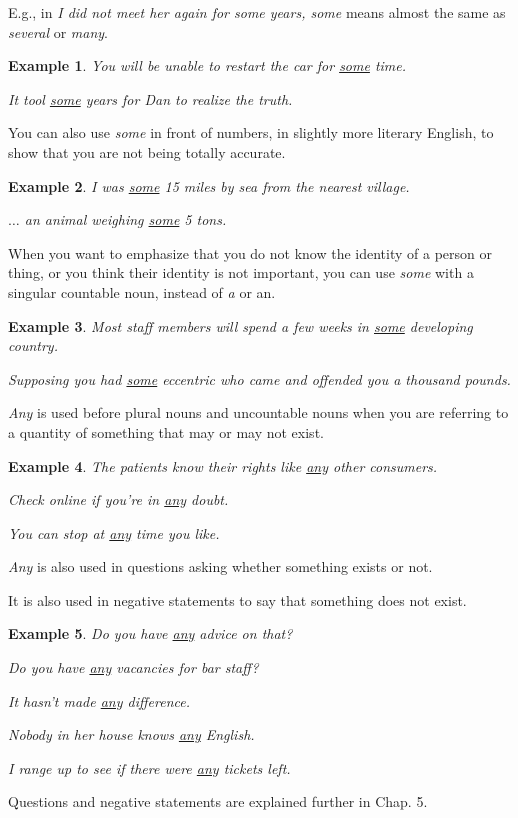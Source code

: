 \documentclass[oneside]{book}
\numberwithin{equation}{section}
\newtheorem{example}{Example}[section]
\begin{document}
E.g., in \textit{I did not meet her again for some years, some} means almost the same as \textit{several} or \textit{many}.
\begin{example}
    You will be unable to restart the car for \underline{some} time.
    
    It tool \underline{some} years for Dan to realize the truth.
\end{example}
%
\noindent{} You can also use \textit{some} in front of numbers, in slightly more literary English, to show that you are not being totally accurate.
\begin{example}
    I was \underline{some} 15 miles by sea from the nearest village.
    
    $\ldots$ an animal weighing \underline{some} 5 tons.
\end{example}
%
\noindent{} When you want to emphasize that you do not know the identity of a person or thing, or you think their identity is not important, you can use \textit{some} with a singular countable noun, instead of \textit{a} or an.
\begin{example}
    Most staff members will spend a few weeks in \underline{some} developing country.
    
    Supposing you had \underline{some} eccentric who came and offended you a thousand pounds.
\end{example}
%
\noindent{} \textit{Any} is used before plural nouns and uncountable nouns when you are referring to a quantity of something that may or may not exist.
\begin{example}
    The patients know their rights like \underline{any} other consumers.
    
    Check online if you're in \underline{any} doubt.
    
    You can stop at \underline{any} time you like.
\end{example}
\textit{Any} is also used in questions asking whether something exists or not.

It is also used in negative statements to say that something does not exist.
\begin{example}
    Do you have \underline{any} advice on that?
    
    Do you have \underline{any} vacancies for bar staff?
    
    It hasn't made \underline{any} difference.
    
    Nobody in her house knows \underline{any} English.
    
    I range up to see if there were \underline{any} tickets left.
\end{example}
Questions and negative statements are explained further in Chap. 5.
\end{document}
